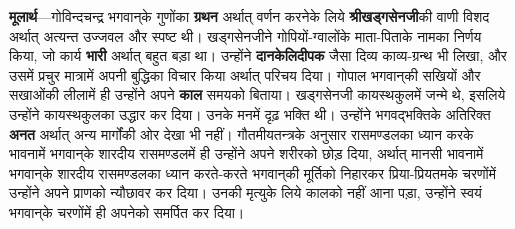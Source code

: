 \begin{sloppypar}\justifying{}
\textbf{मूलार्थ}—गोविन्दचन्द्र भगवान्‌के गुणोंका \textbf{ग्रथन} अर्थात् वर्णन करनेके लिये \textbf{श्रीखड्गसेनजी}की वाणी विशद अर्थात् अत्यन्त उज्जवल और स्पष्ट थी। खड्गसेनजीने गोपियों-ग्वालोंके माता-पिताके नामका निर्णय किया, जो कार्य \textbf{भारी} अर्थात् बहुत बड़ा था। उन्होंने \textbf{दान\-केलि\-दीपक} जैसा दिव्य काव्य-ग्रन्थ भी लिखा, और उसमें प्रचुर मात्रामें अपनी बुद्धिका विचार किया अर्थात् परिचय दिया। गोपाल भगवान्‌की सखियों और सखाओंकी लीलामें ही उन्होंने अपने \textbf{काल} समयको बिताया। खड्गसेनजी कायस्थ\-कुलमें जन्मे थे, इसलिये उन्होंने कायस्थ\-कुलका उद्धार कर दिया। उनके मनमें दृढ़ भक्ति थी। उन्होंने भगवद्भक्तिके अतिरिक्त \textbf{अनत} अर्थात् अन्य मार्गोंकी ओर देखा भी नहीं। गौतमीय\-तन्त्रके अनुसार रासमण्डलका ध्यान करके भावनामें भगवान्‌के शारदीय रासमण्डलमें ही उन्होंने अपने शरीरको छोड़ दिया, अर्थात् मानसी भावनामें भगवान्‌के शारदीय रासमण्डलका ध्यान करते-करते भगवान्‌की मूर्तिको निहारकर प्रिया-प्रियतमके चरणोंमें उन्होंने अपने प्राणको न्यौछावर कर दिया। उनकी मृत्युके लिये कालको नहीं आना पड़ा, उन्होंने स्वयं भगवान्‌के चरणोंमें ही अपनेको समर्पित कर दिया।
\end{sloppypar}


